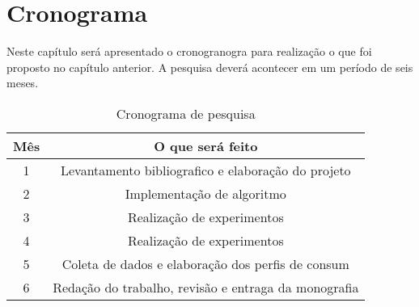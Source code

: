 \chapter{Cronograma}\label{CAP4}
Neste capítulo será apresentado o cronogranogra para realização o que foi proposto no capítulo anterior. A pesquisa deverá acontecer em um período de seis meses.   

\begin{table}[!hp]
\centering
   \caption{Cronograma de pesquisa}
   \label{tab:1}

\begin{tabular}{|c|c|}
 
	\hline
	Mês &  O que será feito\\
	\hline
   1 &  Levantamento bibliografico e elaboração do projeto\\
	\hline
   2 &  Implementação de algoritmo\\
	\hline
	  3 &  Realização de experimentos\\
	\hline  
	4 & Realização de experimentos\\
	\hline  
	5 &  Coleta de dados e elaboração dos perfis de consum\\
	\hline
	  6 & Redação do trabalho, revisão e entraga da monografia\\
	\hline
	
\end{tabular}
\end{table}